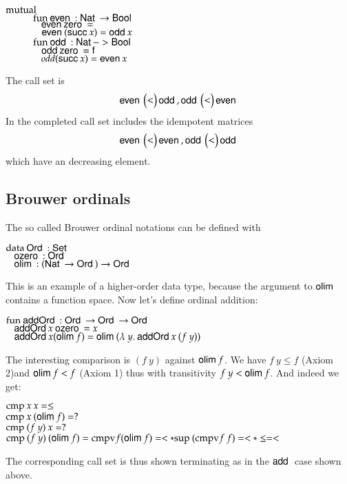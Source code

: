 \begin{bsp}
$\mathrm{mutual}\:$\\
$\spcx \fun \even : \Nat \ra \Bool$\\
$\spcx \spc \even \zero = \tt $\\
$\spcx \spc \even (\suc x) = \odd x $\\
$\spcx \fun \odd : \Nat -> \Bool$\\
$\spcx \spc \odd \zero = \ff$\\
$\spcx \spc  odd (\suc x) = \even x$
\end{bsp}
The call set is 
\[
\mathsf{even}\: \begin{pmatrix}
< \\
\end{pmatrix}\mathsf{odd}\:
, 
\mathsf{odd}\: \begin{pmatrix}
< \\
\end{pmatrix}\mathsf{even}\:
\] 
In the completed call set includes the idempotent matrices
\[
\mathsf{even}\: \begin{pmatrix}
< \\
\end{pmatrix}\mathsf{even}\:
, 
\mathsf{odd}\: \begin{pmatrix}
< \\
\end{pmatrix}\mathsf{odd}\:
\] 
which have an decreasing element.
\subsection{Brouwer ordinals}
The so called Brouwer ordinal notations can be defined with
\begin{bsp}
$\mathrm{data}\: \mathsf{Ord}\: : \mathsf{Set}$ \\
$\hspace*{3mm} \mathsf{ozero}\: : \mathsf{Ord}\: $\\
$\hspace*{3mm} \mathsf{olim}\: : (\mathsf{Nat}\: \rightarrow \mathsf{Ord}\: ) \rightarrow \mathsf{Ord}\: $
\end{bsp}
This is an example of a higher-order data type, because the argument to $\mathsf{olim}\:$ contains a function space.
Now let's define ordinal addition:
\begin{bsp}
$\mathrm{fun}\: \mathsf{addOrd}\: : \mathsf{Ord}\: \rightarrow \mathsf{Ord}\: \rightarrow \mathsf{Ord}\:$\\
$\hspace*{3mm} \mathsf{addOrd}\: x \: \mathsf{ozero}\: = x $\\
$\hspace*{3mm} \mathsf{addOrd}\: x (\mathsf{olim}\: f) = \mathsf{olim}\: ( \lambda\: y .\: \mathsf{addOrd}\:  x \: (f \: y))  $
\end{bsp}
The interesting comparison is $(f \: y)$ against $\mathsf{olim}\: f$.
We have  $f \: y \leq f$ (Axiom 2)and $\mathsf{olim}\: f < f $ (Axiom 1) thus with transitivity $ f\: y < \mathsf{olim}\: f$.
And indeed we get:
\begin{bsp}
$\mathrm{cmp}\: x \: x = \leq $\\
$\mathrm{cmp}\: x \: (\mathsf{olim}\: f) = ? $\\
$\mathrm{cmp}\: (f \: y) \: x = ? $\\
$\mathrm{cmp}\: (f \: y) \: (\mathsf{olim}\: f) = \mathrm{cmpv} f (\mathsf{olim}\: f) = < * \mathrm{sup}\: (\mathrm{cmpv} f \: f) = < * \leq = < $ 
\end{bsp}
The corresponding call set is thus shown terminating as in the $\mathsf{add}\:$ case shown above.
